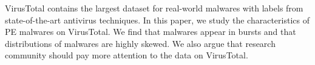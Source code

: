 VirusTotal contains the largest dataset for real-world malwares 
with labels from state-of-the-art antivirus techniques. 
In this paper, we study the characteristics of PE malwares on VirusTotal. 
We find that malwares appear in bursts and that distributions of malwares are highly skewed. 
We also argue that research community should pay more attention to the data on VirusTotal. 